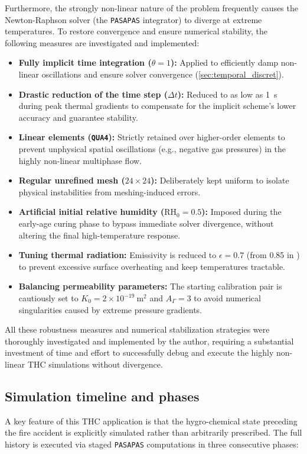 Furthermore, the strongly non-linear nature of the problem frequently causes the Newton-Raphson solver (the \texttt{PASAPAS} integrator) to diverge at extreme temperatures. To restore convergence and ensure numerical stability, the following measures are investigated and implemented:

\begin{itemize}
    \item \textbf{Fully implicit time integration ($\theta=1$):} Applied to efficiently damp non-linear oscillations and ensure solver convergence (\cref{sec:temporal_discret}).
    \item \textbf{Drastic reduction of the time step ($\Delta t$):} Reduced to as low as \SI{1}{\second} during peak thermal gradients to compensate for the implicit scheme's lower accuracy and guarantee stability.
    \item \textbf{Linear elements (\texttt{QUA4}):} Strictly retained over higher-order elements to prevent unphysical spatial oscillations (e.g., negative gas pressures) in the highly non-linear multiphase flow.
    \item \textbf{Regular unrefined mesh ($24 \times 24$):} Deliberately kept uniform to isolate physical instabilities from meshing-induced errors.
    \item \textbf{Artificial initial relative humidity ($\mathrm{RH}_0 = 0.5$):} Imposed during the early-age curing phase to bypass immediate solver divergence, without altering the final high-temperature response.
    \item \textbf{Tuning thermal radiation:} Emissivity is reduced to $\epsilon=0.7$ (from 0.85 in \cite{dauti2018}) to prevent excessive surface overheating and keep temperatures tractable.
    \item \textbf{Balancing permeability parameters:} The starting calibration pair is cautiously set to $K_0 = 2\times 10^{-19}~\mathrm{m^2}$ and $A_\Gamma = 3$ to avoid numerical singularities caused by extreme pressure gradients.
\end{itemize}

All these robustness measures and numerical stabilization strategies were thoroughly investigated and implemented by the author, requiring a substantial investment of time and effort to successfully debug and execute the highly non-linear THC simulations without divergence.

\subsection{Simulation timeline and phases} \label{sec:simulation-phases}
A key feature of this THC application is that the hygro-chemical state preceding the fire accident is explicitly simulated rather than arbitrarily prescribed. The full history is executed via staged \texttt{PASAPAS} computations in three consecutive phases:

